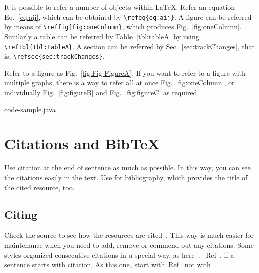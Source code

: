\documentclass[10pt,journal,compsoc]{IEEEtran}
\newcommand{\reffig}[1]{Fig.~\ref{#1}}
\newcommand{\refeq}[1]{Eq.~\ref{#1}}
\newcommand{\reftbl}[1]{Table~\ref{#1}}
\newcommand{\refsec}[1]{Sec.~\ref{#1}}
\newcommand{\refcite}[1]{Ref~\cite{#1}}
\theoremstyle{plain}
\theoremstyle{definition}
\theoremstyle{remark}
\begin{document}
It is possible to refer a number of objects within \LaTeX.
Refer an equation \refeq{eq:aij}, which can be obtained by \verb!\refeq{eq:aij}!. 
A figure can be referred by means of \verb!\reffig{fig:oneColumn}!, which produces \reffig{fig:oneColumn}.
Similarly a table can be referred by \reftbl{tbl:tableA} by using \verb!\reftbl{tbl:tableA}!.
A section can be referred by \refsec{sec:trackChanges}, 
that is, 
\verb!\refsec{sec:trackChanges}!.

Refer to a figure as \reffig{fig:Fig-FigureA}.
If you want to refer to a figure with multiple graphs,
there is a way to refer all at once \reffig{fig:oneColumn},
or individually \reffig{fig:figureB} and \reffig{fig:figureC} as required.








	{code-sample.java}




\section{Citations and BibTeX}

Use citation at  the end of sentence as much as possible.
In this way, 
you can see the citations easily in the text.
Use \verb!! for bibliography,
which provides the title of the cited resource, too. 




\subsection{Citing}

Check the source to see how the resources are cited~\cite{%
	chomsky1993,%
	wikiComplexNetwork}.
This way is much easier for maintenance
when you need to add, remove or commend out any citations.
Some styles organized consecutive citations in a special way,
as here~\cite{%
	feynman1965feynman,
	feynman2018computation,
	feynman2018gravitation,
	feynman1985surely}.
~\refcite{%
	acemoglu2010},
if a sentence starts with citation,
As this one,
start with~\refcite{%
	acemoglu2010}  
not with~\cite{%
	acemoglu2010}.
\end{document}
